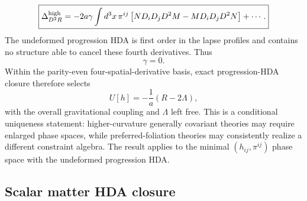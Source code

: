 \documentclass[11pt]{article}
\begin{document}
\begin{equation}
\boxed{
\Delta_{D^2R}^{\rm high}
=-2a\gamma\int d^3x\,\pi^{ij}
\left[ND_iD_jD^2M-MD_iD_jD^2N\right]+\cdots .}
\label{eq:D2R_anomaly}
\end{equation}
The undeformed progression HDA is first order in the lapse profiles and contains no structure able to cancel these fourth derivatives. Thus
\begin{equation}
    \boxed{\gamma=0.}
\end{equation}
Within the parity-even four-spatial-derivative basis, exact progression-HDA closure therefore selects
\begin{equation}
\boxed{
U[h]= -\frac{1}{a}\left(R-2\Lambda\right),}
\label{eq:potential_uniqueness}
\end{equation}
with the overall gravitational coupling and $\Lambda$ left free. This is a conditional uniqueness statement: higher-curvature generally covariant theories may require enlarged phase spaces, while preferred-foliation theories may consistently realize a different constraint algebra. The result applies to the minimal $(h_{ij},\pi^{ij})$ phase space with the undeformed progression HDA.

\subsection{Scalar matter HDA closure}
\label{subsec:matter_closure}
\end{document}
